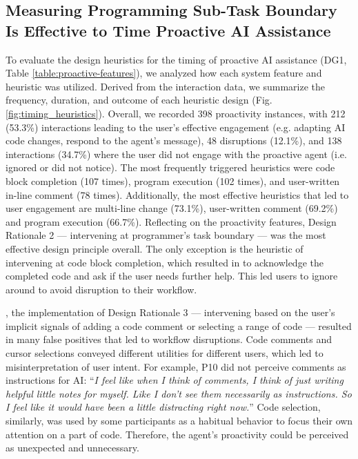 \subsection{Measuring Programming Sub-Task Boundary Is Effective to Time Proactive AI Assistance}
To evaluate the design heuristics for the timing of proactive AI assistance (DG1, Table \ref{table:proactive-features}), we analyzed how each system feature and heuristic was utilized. 
Derived from the interaction data, we summarize the frequency, duration, and outcome of each heuristic design (Fig.\ref{fig:timing_heuristics}). 
Overall, we recorded 398 proactivity instances, with 212 (53.3\%) interactions leading to the user's effective engagement (e.g. adapting AI code changes, respond to the agent's message), 48 disruptions (12.1\%), and 138 interactions (34.7\%) where the user did not engage with the proactive agent (i.e. ignored or did not notice).
The most frequently triggered heuristics were code block completion (107 times), program execution (102 times), and user-written in-line comment (78 times). 
Additionally, the most effective heuristics that led to user engagement are multi-line change (73.1\%), user-written comment (69.2\%) and program execution (66.7\%).
Reflecting on the proactivity features, Design Rationale 2 --- intervening at programmer's task boundary --- was the most effective design principle overall.
The only exception is the heuristic of intervening at code block completion, which resulted in  to acknowledge the completed code and ask if the user needs further help. This led users to ignore around  to avoid disruption to their workflow.

, the implementation of Design Rationale 3 --- intervening based on the user's implicit signals of adding a code comment or selecting a range of code --- resulted in many false positives that led to workflow disruptions.
Code comments and cursor selections conveyed different utilities for different users, which led to misinterpretation of user intent.
For example, P10 did not perceive comments as instructions for AI: ``\textit{I feel like when I think of comments, I think of just writing helpful little notes for myself. Like I don't see them necessarily as instructions. So I feel like it would have been a little distracting right now.}''
Code selection, similarly, was used by some participants as a habitual behavior to focus their own attention on a part of code. Therefore, the agent's proactivity could be perceived as unexpected and unnecessary.

